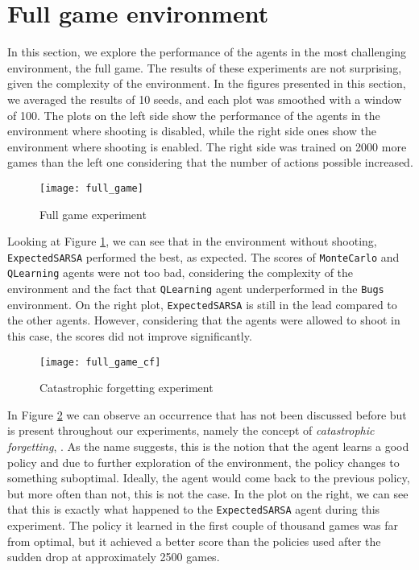 \section{Full game environment}
In this section, we explore the performance of the agents in the most challenging environment, the full game. The results of these experiments are not surprising, given the complexity of the environment. In the figures presented in this section, we averaged the results of 10 seeds, and each plot was smoothed with a window of 100. The plots on the left side show the performance of the agents in the environment where shooting is disabled, while the right side ones show the environment where shooting is enabled. The right side was trained on 2000 more games than the left one considering that the number of actions possible increased.

\begin{figure}[h]
    \centering
    \texttt{[image: full\_game]}
    \caption{Full game experiment}
    \label{fig:full_game_eg}
\end{figure}

Looking at Figure \ref{fig:full_game_eg}, we can see that in the environment without shooting, \texttt{ExpectedSARSA} performed the best, as expected. The scores of \texttt{MonteCarlo} and \texttt{QLearning} agents were not too bad, considering the complexity of the environment and the fact that \texttt{QLearning} agent underperformed in the \texttt{Bugs} environment. On the right plot, \texttt{ExpectedSARSA} is still in the lead compared to the other agents. However, considering that the agents were allowed to shoot in this case, the scores did not improve significantly.

\begin{figure}[h]
    \centering
    \texttt{[image: full\_game\_cf]}
    \caption{Catastrophic forgetting experiment}
    \label{fig:full_game_cf_eg}
\end{figure}

In Figure \ref{fig:full_game_cf_eg} we can observe an occurrence that has not been discussed before but is present throughout our experiments, namely the concept of \textit{catastrophic forgetting}, \cite{russell2010artificial}. As the name suggests, this is the notion that the agent learns a good policy and due to further exploration of the environment, the policy changes to something suboptimal. Ideally, the agent would come back to the previous policy, but more often than not, this is not the case. In the plot on the right, we can see that this is exactly what happened to the \texttt{ExpectedSARSA} agent during this experiment. The policy it learned in the first couple of thousand games was far from optimal, but it achieved a better score than the policies used after the sudden drop at approximately 2500 games.

